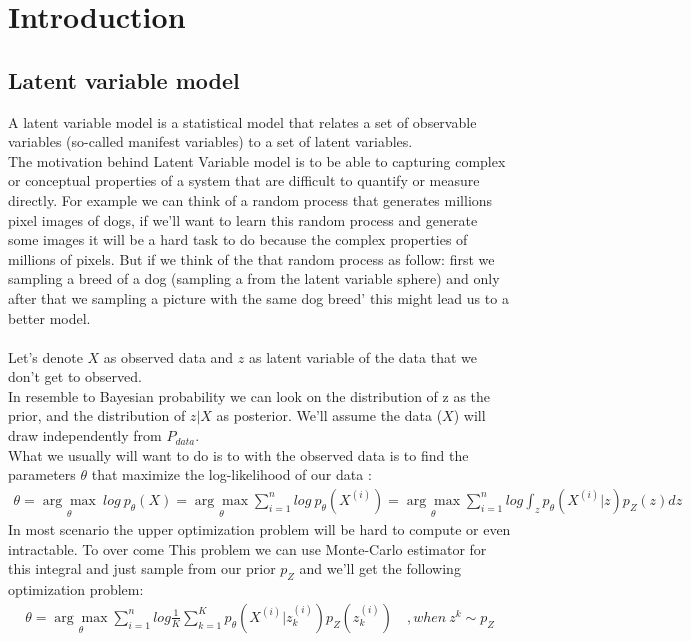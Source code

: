 \chapter*{Introduction}
\section*{Latent variable model}
A latent variable model is a statistical model that relates a set of observable variables (so-called manifest variables) to a set of latent variables.
\\ The motivation behind Latent Variable model is to be able to  capturing complex or conceptual properties of a system that are difficult to quantify or measure directly. For example we can think of a random process that generates millions pixel images of dogs, if we'll want to learn this random process and generate some images it will be a hard task to do because the complex properties of millions of pixels. But if we think of the that random process as follow: first we sampling a breed of a dog (sampling a from the latent variable sphere) and only after that we sampling a picture with the same dog breed' this might lead us to a better model.\\ \\ 
Let's denote $X$ as observed data and $z$ as latent variable of the data that we don't get to observed. \\ In resemble to Bayesian probability  we can look on the distribution of z as the prior, and the distribution of $z|X$ as posterior. We'll assume the data ($X$) will draw independently from $P_{data}$. \\ 
What we usually will want to do is to with the observed data is to find the parameters $\theta$ that maximize the log-likelihood of our data :
\begin{gather*}
\theta = \underset{\theta}{\arg\max} \ log \ p_{\theta}(X)=\underset{\theta}{\arg\max} \sum_{i=1}^{n} log \ p_{\theta}(X^{(i)})=\underset{\theta}{\arg\max} \sum_{i=1}^{n}log \int_z p_{\theta}(X^{(i)}|z)p_{Z}(z)dz
\end{gather*}
In most scenario the upper optimization problem will be hard to compute or even intractable. To over come This problem we can use Monte-Carlo estimator for this integral and just sample from our prior $p_{Z}$ and we'll get the following optimization problem: 
\begin{gather*}
\theta = \underset{\theta}{\arg\max} \sum_{i=1}^{n}log \frac{1}{K} \sum_{k=1}^{K} p_{\theta}(X^{(i)}|z_{k}^{(i)})p_{Z}(z_{k}^{(i)}) \quad , when \ z^{k}\sim p_{Z}
\end{gather*}
